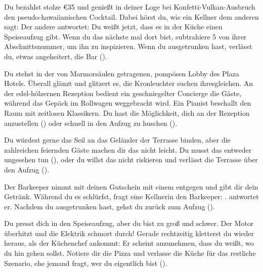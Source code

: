 {		%
		 Du bezahlst stolze €35 und genießt in deiner Loge bei Konfetti-Vulkan-Ausbruch den pseudo-hawaiianischen Cocktail. Dabei hörst du, wie ein Kellner dem anderen sagt:  Der andere antwortet:  Du weißt jetzt, dass es in der Küche einen Speiseaufzug gibt. Wenn du das nächste mal dort bist, subtrahiere 5 von ihrer Abschnittsnummer, um ihn zu inspizieren. Wenn du ausgetrunken hast, verlässt du, etwas angeheitert, die Bar ().

		 Du stehst in der von Marmorsäulen getragenen, pompösen Lobby des Plaza Hotels. Überall glänzt und glitzert es, die Kronleuchter suchen ihresgleichen. An der edel-hölzernen Rezeption bedient ein geschniegelter Concierge die Gäste, während das Gepäck im Rollwagen weggebracht wird. Ein Pianist beschallt den Raum mit zeitlosen Klassikern. Du hast die Möglichkeit, dich an der Rezeption anzustellen () oder schnell in den Aufzug zu huschen ().

	 Du würdest gerne das Seil an das Geländer der Terrasse binden, aber die zahlreichen feiernden Gäste machen dir das nicht leicht. Du musst das entweder ungesehen tun (), oder du willst das nicht riskieren und verlässt die Terrasse über den Aufzug ().

		 Der Barkeeper nimmt mit deinen Gutschein mit einem  entgegen und gibt dir dein Getränk. Während du es schlürfst, fragt eine Kellnerin den Barkeeper: .  antwortet er. Nachdem du ausgetrunken hast, gehst du zurück zum Aufzug ().

		 Du presst dich in den Speiseaufzug, aber du bist zu groß und schwer. Der Motor überhitzt und die Elektrik schmort durch! Gerade rechtzeitig kletterst du wieder heraus, als der Küchenchef ankommt:  Er scheint anzunehmen, dass du weißt, wo du hin gehen sollst. Notiere dir die Pizza  und verlasse die Küche für das restliche Szenario, ehe jemand fragt, wer du eigentlich bist ().

}
